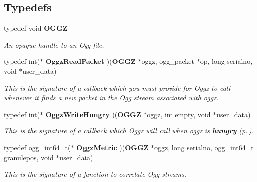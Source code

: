 \subsection*{Typedefs}
\begin{CompactItemize}
\item 
typedef void {\bf OGGZ}
\begin{CompactList}\small\item\em An opaque handle to an Ogg file. \item\end{CompactList}\item 
typedef int($\ast$ {\bf Oggz\-Read\-Packet} )({\bf OGGZ} $\ast$oggz, ogg\_\-packet $\ast$op, long serialno, void $\ast$user\_\-data)
\begin{CompactList}\small\item\em This is the signature of a callback which you must provide for Oggz to call whenever it finds a new packet in the Ogg stream associated with {\em oggz\/}. \item\end{CompactList}\item 
typedef int($\ast$ {\bf Oggz\-Write\-Hungry} )({\bf OGGZ} $\ast$oggz, int empty, void $\ast$user\_\-data)
\begin{CompactList}\small\item\em This is the signature of a callback which Oggz will call when {\em oggz\/} is {\bf hungry }{\rm (p.\,\pageref{group__hungry})}. \item\end{CompactList}\item 
typedef ogg\_\-int64\_\-t($\ast$ {\bf Oggz\-Metric} )({\bf OGGZ} $\ast$oggz, long serialno, ogg\_\-int64\_\-t granulepos, void $\ast$user\_\-data)
\begin{CompactList}\small\item\em This is the signature of a function to correlate Ogg streams. \item\end{CompactList}\end{CompactItemize}
